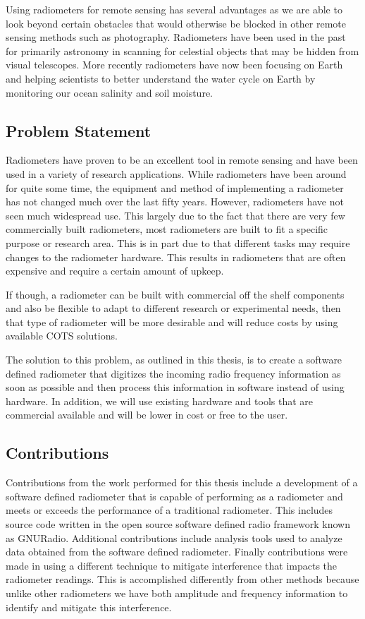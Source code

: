 Using radiometers for remote sensing has several advantages as we are able to look beyond certain obstacles that would otherwise be blocked in other remote sensing methods such as photography.  Radiometers have been used in the past for primarily astronomy in scanning for celestial objects that may be hidden from visual telescopes.  More recently radiometers have now been focusing on Earth and helping scientists to better understand the water cycle on Earth by monitoring our ocean salinity and soil moisture.  

\subsection{Problem Statement}
Radiometers have proven to be an excellent tool in remote sensing and have been used in a variety of research applications.  While radiometers have been around for quite some time, the equipment and method of implementing a radiometer has not changed much over the last fifty years.  However, radiometers have not seen much widespread use.  This largely due to the fact that there are very few commercially built radiometers, most radiometers are built to fit a specific purpose or research area.  This is in part due to that different tasks may require changes to the radiometer hardware.  This results in radiometers that are often expensive and require a certain amount of upkeep.  

If though, a radiometer can be built with commercial off the shelf components and also be flexible to adapt to different research or experimental needs, then that type of radiometer will be more desirable and will reduce costs by using available COTS solutions.  

The solution to this problem, as outlined in this thesis, is to create a software defined radiometer that digitizes the incoming radio frequency information as soon as possible and then process this information in software instead of using hardware.  In addition, we will use existing hardware and tools that are commercial available and will be lower in cost or free to the user.  

\subsection{Contributions}
Contributions from the work performed for this thesis include a development of a software defined radiometer that is capable of performing as a radiometer and meets or exceeds the performance of a traditional radiometer.  This includes source code written in the open source software defined radio framework known as GNURadio.  Additional contributions include analysis tools used to analyze data obtained from the software defined radiometer.  Finally contributions were made in using a different technique to mitigate interference that impacts the radiometer readings.  This is accomplished differently from other methods because unlike other radiometers we have both amplitude and frequency information to identify and mitigate this interference.

